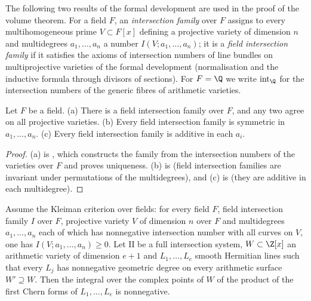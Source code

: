 The following two results of the formal development are used in the proof of the volume theorem.
For a field $F$, an \emph{intersection family} over $F$ assigns to every multihomogeneous prime
$V\subset F[x]$ defining a projective variety of dimension $n$ and multidegrees $a_1,\dots,a_n$ a number
$I(V;a_1,\dots,a_n)$; it is a \emph{field intersection family} if it satisfies the axioms of intersection
numbers of line bundles on multiprojective varieties of the formal development (normalisation and the
inductive formula through divisors of sections). For $F=\Q$ we write $\mathrm{int}_\Q$ for the intersection
numbers of the generic fibres of arithmetic varieties.

\begin{lemma}\label{pf:towergeo:fieldnumbers}
Let $F$ be a field. (a) There is a field intersection family over $F$, and any two agree on all projective
varieties. (b) Every field intersection family is symmetric in $a_1,\dots,a_n$. (c) Every field intersection
family is additive in each $a_i$.
\end{lemma}

\begin{proof}
(a) is , which constructs the family from
the intersection numbers of the varieties over $F$ and proves uniqueness. (b) is
 (field intersection families
are invariant under permutations of the multidegrees), and (c) is
 (they are additive in each multidegree).
\end{proof}

\begin{lemma}\label{pf:towergeo:ptsint}
Assume the Kleiman criterion over fields: for every field $F$, field intersection family $I$ over $F$,
projective variety $V$ of dimension $n$ over $F$ and multidegrees $a_1,\dots,a_n$ each of which has
nonnegative intersection number with all curves on $V$, one has $I(V;a_1,\dots,a_n)\ge0$. Let $\mathrm{II}$ be
a full intersection system, $W\subset\Z[x]$ an arithmetic variety of dimension $e+1$ and $L_1,\dots,L_e$
smooth Hermitian lines such that every $L_j$ has nonnegative geometric degree on every arithmetic surface
$W'\supseteq W$. Then the integral over the complex points of $W$ of the product of the first Chern forms
of $L_1,\dots,L_e$ is nonnegative.
\end{lemma}

